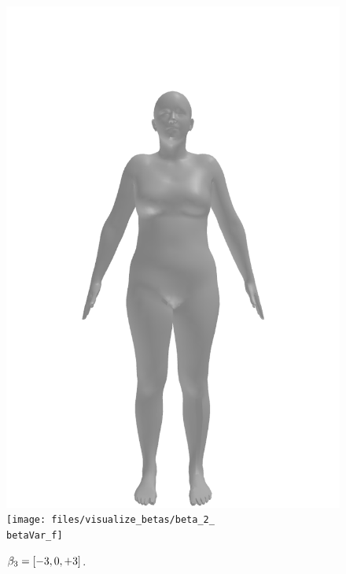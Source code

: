 \begin{figure}[ht!]
\begin{minipage}[b]{\textwidth}
        \includegraphics[width=\imgWidth]{files/visualize_betas/baseline_f}
        \texttt{[image: files/visualize\_betas/beta\_2\_\\betaVar\_f]}
        \caption[Effect of varying $\beta_3$ in SMPL.]{$\beta_3 = [-3, 0, +3]$.}
    \end{minipage}
\end{figure}

